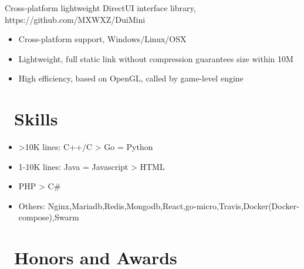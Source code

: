 \documentclass{resume}
\begin{document}
Cross-platform lightweight DirectUI interface library, https://github.com/MXWXZ/DuiMini
\begin{itemize}
    \item Cross-platform support, Windows/Linux/OSX
    \item Lightweight, full static link without compression guarantees size within 10M
    \item High efficiency, based on OpenGL, called by game-level engine
\end{itemize}


\section{\faCogs\ Skills}
\begin{itemize}[parsep=0.5ex]
    \item >10K lines: C++/C > Go = Python
    \item 1-10K lines: Java = Javascript > HTML
    \item <1K lines: Shell > PHP > C\#
    \item Others: Nginx,Mariadb,Redis,Mongodb,React,go-micro,Travis,Docker(Docker-compose),Swarm
\end{itemize}

\section{\faHeartO\ Honors and Awards}
\end{document}
